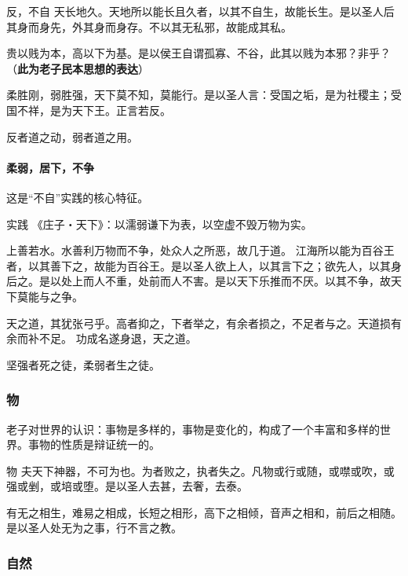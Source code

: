 \documentclass{ctexart}
\begin{document}
\begin{fancybox}{反，不自}
    天长地久。天地所以能长且久者，以其不自生，故能长生。是以圣人后其身而身先，外其身而身存。不以其无私邪，故能成其私。

    贵以贱为本，高以下为基。是以侯王自谓孤寡、不谷，此其以贱为本邪？非乎？（\textbf{此为老子民本思想的表达}）

    柔胜刚，弱胜强，天下莫不知，莫能行。是以圣人言：受国之垢，是为社稷主；受国不祥，是为天下王。正言若反。

    反者道之动，弱者道之用。
\end{fancybox}

\paragraph{柔弱，居下，不争}

这是“不自”实践的核心特征。

\begin{fancybox}{实践}
    《庄子‧天下》：以濡弱谦下为表，以空虚不毁万物为实。

    上善若水。水善利万物而不争，处众人之所恶，故几于道。
    江海所以能为百谷王者，以其善下之，故能为百谷王。是以圣人欲上人，以其言下之；欲先人，以其身后之。是以处上而人不重，处前而人不害。是以天下乐推而不厌。以其不争，故天下莫能与之争。

    天之道，其犹张弓乎。高者抑之，下者举之，有余者损之，不足者与之。天道损有余而补不足。
    功成名遂身退，天之道。

    坚强者死之徒，柔弱者生之徒。
\end{fancybox}

\subsubsection{物}

老子对世界的认识：事物是多样的，事物是变化的，构成了一个丰富和多样的世界。事物的性质是辩证统一的。

\begin{fancybox}{物}
    夫天下神器，不可为也。为者败之，执者失之。凡物或行或随，或噤或吹，或强或剉，或培或堕。是以圣人去甚，去奢，去泰。

    有无之相生，难易之相成，长短之相形，高下之相倾，音声之相和，前后之相随。是以圣人处无为之事，行不言之教。
\end{fancybox}

\subsubsection{自然}
\end{document}
